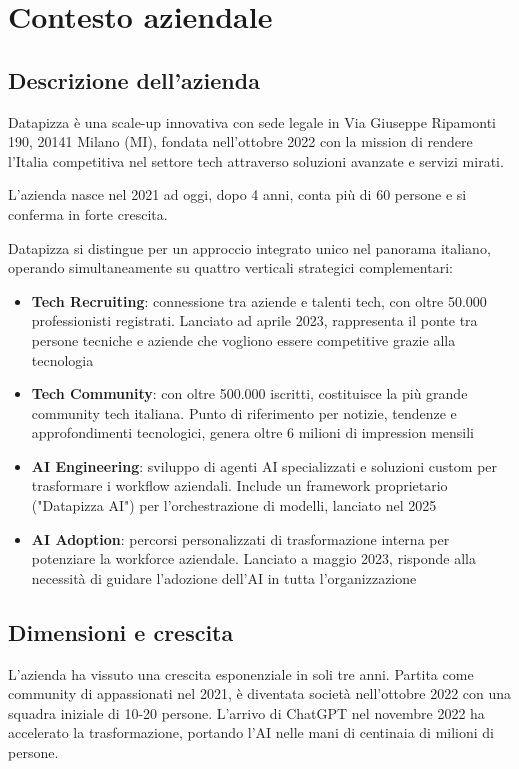 \chapter{Contesto aziendale}

\section{Descrizione dell'azienda}
Datapizza è una scale-up innovativa con sede legale in Via Giuseppe Ripamonti 190, 20141 Milano (MI), fondata nell'ottobre 2022 con la mission di rendere l'Italia competitiva nel settore tech attraverso soluzioni avanzate e servizi mirati.

L'azienda nasce nel 2021 ad oggi, dopo 4 anni, conta più di 60 persone e si conferma in forte crescita.

Datapizza si distingue per un approccio integrato unico nel panorama italiano, operando simultaneamente su quattro verticali strategici complementari:

\begin{itemize}
  \item \textbf{Tech Recruiting}: connessione tra aziende e talenti tech, con oltre 50.000 professionisti registrati. Lanciato ad aprile 2023, rappresenta il ponte tra persone tecniche e aziende che vogliono essere competitive grazie alla tecnologia
  
  \item \textbf{Tech Community}: con oltre 500.000 iscritti, costituisce la più grande community tech italiana. Punto di riferimento per notizie, tendenze e approfondimenti tecnologici, genera oltre 6 milioni di impression mensili
  
  \item \textbf{AI Engineering}: sviluppo di agenti AI specializzati e soluzioni custom per trasformare i workflow aziendali. Include un framework proprietario ("Datapizza AI") per l'orchestrazione di modelli, lanciato nel 2025
  
  \item \textbf{AI Adoption}: percorsi personalizzati di trasformazione interna per potenziare la workforce aziendale. Lanciato a maggio 2023, risponde alla necessità di guidare l'adozione dell'AI in tutta l'organizzazione
\end{itemize}

\section{Dimensioni e crescita}
L'azienda ha vissuto una crescita esponenziale in soli tre anni. Partita come community di appassionati nel 2021, è diventata società nell'ottobre 2022 con una squadra iniziale di 10-20 persone. L'arrivo di ChatGPT nel novembre 2022 ha accelerato la trasformazione, portando l'AI nelle mani di centinaia di milioni di persone.

